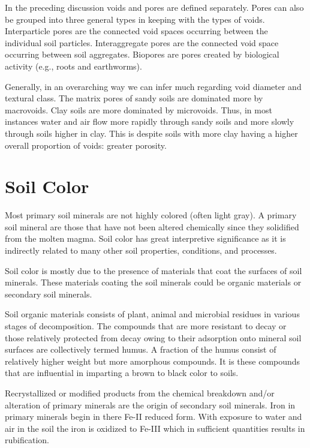 \documentclass[letterpaper, 12pt]{article}
\begin{document}
In the preceding discussion voids and pores are defined separately. Pores can also be grouped into three general types in keeping with the types of voids. Interparticle pores are the connected void spaces occurring between the individual soil particles. Interaggregate pores are the connected void space occurring between soil aggregates. Biopores are pores created by biological activity (e.g., roots and earthworms).

Generally, in an overarching way we can infer much regarding void diameter and textural class. The matrix pores of sandy soils are dominated more by macrovoids. Clay soils are more dominated by microvoids. Thus, in most instances water and air flow more rapidly through sandy soils and more slowly through soils higher in clay. This is despite soils with more clay having a higher overall proportion of voids: greater porosity.

\section{Soil Color}
\label{color}
    
Most primary soil minerals are not highly colored (often light gray). A primary soil mineral are those that have not been altered chemically since they solidified from the molten magma. Soil color has great interpretive significance as it is indirectly related to many other soil properties, conditions, and processes.

Soil color is mostly due to the presence of materials that coat the surfaces of soil minerals. These materials coating the soil minerals could be organic materials or secondary soil minerals.

Soil organic materials consists of plant, animal and microbial residues in various stages of decomposition. The compounds that are more resistant to decay or those relatively protected from decay owing to their adsorption onto mineral soil surfaces are  collectively termed humus. A fraction of the humus consist of relatively higher weight but more amorphous compounds. It is these compounds that are influential in imparting a brown to black color to soils.

Recrystallized or modified products from the chemical breakdown and/or alteration of primary minerals are the origin of secondary soil minerals. Iron in primary minerals begin in there Fe-II reduced form. With exposure to water and air in the soil the iron is oxidized to Fe-III which in sufficient quantities results in rubification.
 
\end{document}
